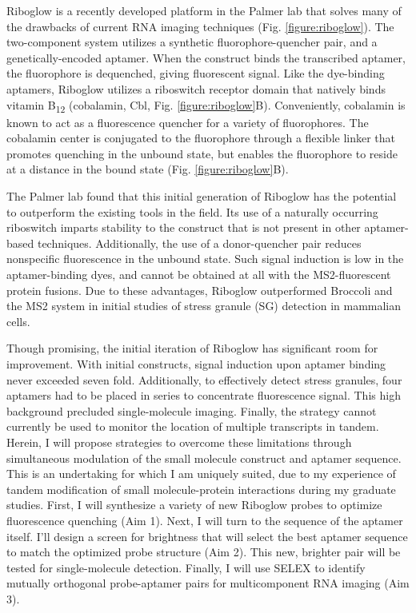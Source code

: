 Riboglow is a recently developed platform in the Palmer lab that solves many of the drawbacks of current RNA imaging techniques (Fig. \ref{figure:riboglow}).\cite{BraselmannDevelopmentriboswitchbasedplatform2017} The two-component system utilizes a synthetic fluorophore-quencher pair, and a genetically-encoded aptamer. When the construct binds the transcribed aptamer, the fluorophore is dequenched, giving fluorescent signal. Like the dye-binding aptamers, Riboglow utilizes a riboswitch receptor domain that natively binds vitamin B\textsubscript{12} (cobalamin, Cbl, Fig. \ref{figure:riboglow}B).\cite{JohnsonJrB12cofactorsdirectly2012} Conveniently, cobalamin is known to act as a fluorescence quencher for a variety of fluorophores.\cite{RosendahlSynthesisbiologicalactivity1982,LeeDesignSynthesisCharacterization2009,SmeltzerSynthesisCharacterizationFluorescent2001} The cobalamin center is conjugated to the fluorophore through a flexible linker that promotes quenching in the unbound state, but enables the fluorophore to reside at a distance in the bound state (Fig. \ref{figure:riboglow}B).

The Palmer lab found that this initial generation of Riboglow has the potential to outperform the existing tools in the field. Its use of a naturally occurring riboswitch imparts stability to the construct that is not present in other aptamer-based techniques. Additionally, the use of a donor-quencher pair reduces nonspecific fluorescence in the unbound state. Such signal induction is low in the aptamer-binding dyes, and cannot be obtained at all with the MS2-fluorescent protein fusions. Due to these advantages, Riboglow outperformed Broccoli and the MS2 system in initial studies of stress granule (SG) detection in mammalian cells.

Though promising, the initial iteration of Riboglow has significant room for improvement. With initial constructs, signal induction upon aptamer binding never exceeded seven fold. Additionally, to effectively detect stress granules, four aptamers had to be placed in series to concentrate fluorescence signal. This high background precluded single-molecule imaging. Finally, the strategy cannot currently be used to monitor the location of multiple transcripts in tandem. Herein, I will propose strategies to overcome these limitations through simultaneous modulation of the small molecule construct and aptamer sequence. This is an undertaking for which I am uniquely suited, due to my experience of tandem modification of small molecule-protein interactions during my graduate studies. First, I will synthesize a variety of new Riboglow probes to optimize fluorescence quenching (Aim 1). Next, I will turn to the sequence of the aptamer itself. I'll design a screen for brightness that will select the best aptamer sequence to match the optimized probe structure (Aim 2). This new, brighter pair will be tested for single-molecule detection. Finally, I will use SELEX to identify mutually orthogonal probe-aptamer pairs for multicomponent RNA imaging (Aim 3).

